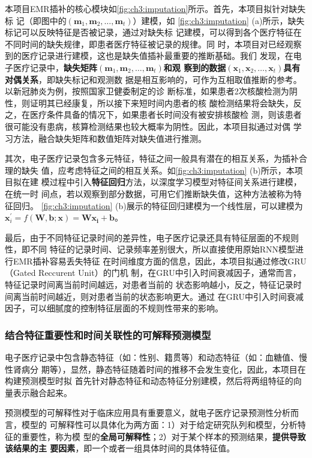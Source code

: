 本项目EMR插补的核心模块如\cref{fig:ch3:imputation}所示。首先，本项目拟针对缺失标
记（即图中的$(\bm m_1, \bm m_2, \dots, \bm m_t)$）建模，如
\cref{fig:ch3:imputation} (a)所示，缺失标记可以反映特征是否被记录，通过对缺失标
记建模，可以得到各个医疗特征在不同时间的缺失规律，即患者医疗特征被记录的规律。同
时，本项目对已经观察到的医疗记录进行建模，这也是缺失值插补最重要的推断基础。我们
发现，在电子医疗记录中，\textbf{缺失矩阵$(\bm m_1, \bm m_2, \dots, \bm m_t)$和观
察到的数据$(\bm x_1, \bm x_2, \dots, \bm x_t)$具有对偶关系}，即缺失标记和观测数
据是相互影响的，可作为互相取值推断的参考。以新冠肺炎为例，按照国家卫健委制定的诊
断标准，如果患者2次核酸检测为阴性，则证明其已经康复，所以接下来短时间内患者的核
酸检测结果将会缺失，反之，在医疗条件具备的情况下，如果患者长时间没有被安排核酸检
测，则该患者很可能没有患病，核算检测结果也较大概率为阴性。因此，本项目拟通过对偶
学习方法，融合缺失矩阵和数值矩阵对缺失值进行推测。

其次，电子医疗记录包含多元特征，特征之间一般具有潜在的相互关系，为插补合理的缺失
值，应考虑特征之间的相互关系。如\cref{fig:ch3:imputation} (b)所示，本项目拟在建
模过程中引入\textbf{特征回归}方法，以深度学习模型对特征间关系进行建模，在统一时
间点，若以观察到部分数据，可用它们推断缺失值，这种方法被称为特征回归。
\cref{fig:ch3:imputation} (b)展示的特征回归建模为一个线性层，可以建模为$\bm
x_i^{\prime} = f(\bm W, \bm b; \bm x) = \bm{Wx_i}+\bm b$。

最后，由于不同特征记录时间的差异性，电子医疗记录还具有特征层面的不规则性，即不同
特征的记录时间、记录频率差别很大，所以直接使用原始RNN模型进行EMR插补容易丢失特征
在时间维度方面的信息，因此，本项目拟通过修改GRU（Gated Reccurent Unit）的门机
制，在GRU中引入时间衰减因子，通常而言，特征记录时间离当前时间越远，对患者当前的
状态影响越小，反之，特征记录时间离当前时间越近，则对患者当前的状态影响更大。通过
在GRU中引入时间衰减因子，可以细腻度的控制特征层面的不规则性带来的影响。


\subsubsection{结合特征重要性和时间关联性的可解释预测模型}\label{ch3_3}

电子医疗记录中包含静态特征（如：性别、籍贯等）和动态特征（如：血糖值、慢性肾病分
期等），显然，静态特征随着时间的推移不会发生变化，因此，本项目在构建预测模型时拟
首先针对静态特征和动态特征分别建模，然后将两组特征的向量表示融合起来。

预测模型的可解释性对于临床应用具有重要意义，就电子医疗记录预测性分析而言，模型的
可解释性可以具体化为两方面：1）对于给定研究队列和模型，分析特征的重要性，称为模
型的\textbf{全局可解释性}；2）对于某个样本的预测结果，\textbf{提供导致该结果的主
要因素}，即一个或者一组具体时间的具体特征值。

